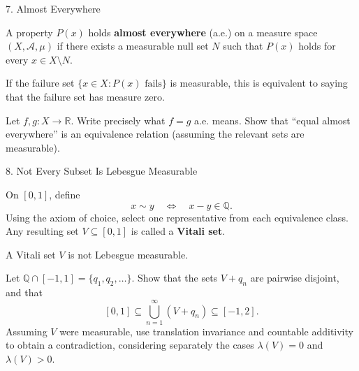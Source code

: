 \documentclass[12pt,a4paper]{article}
\begin{document}
\clearpage

\begin{heading}
    7. Almost Everywhere
\end{heading}

\vspace{10pt}

\begin{definition}
    A property $P(x)$ holds \textbf{almost everywhere} (a.e.) on a measure space $(X,\mathcal{A},\mu)$ if there exists a measurable null set $N$ such that $P(x)$ holds for every $x\in X\setminus N$.

    If the failure set $\{x\in X:P(x)\text{ fails}\}$ is measurable, this is equivalent to saying that the failure set has measure zero.
\end{definition}

\clearpage

\begin{problem}
    Let $f,g:X\to\mathbb{R}$. Write precisely what $f=g$ a.e. means. Show that ``equal almost everywhere'' is an equivalence relation (assuming the relevant sets are measurable).
\end{problem}

\clearpage

\begin{heading}
    8. Not Every Subset Is Lebesgue Measurable
\end{heading}

\vspace{10pt}

\begin{definition}
    On $[0,1]$, define
    \[
        x\sim y\quad\Longleftrightarrow\quad x-y\in\mathbb{Q}.
    \]
    Using the axiom of choice, select one representative from each equivalence class. Any resulting set $V\subseteq[0,1]$ is called a \textbf{Vitali set}.
\end{definition}

\begin{theorem}
    A Vitali set $V$ is not Lebesgue measurable.
\end{theorem}

\clearpage

\begin{problem}
    Let $\mathbb{Q}\cap[-1,1]=\{q_1,q_2,\ldots\}$. Show that the sets $V+q_n$ are pairwise disjoint, and that
    \[
        [0,1]\subseteq\bigcup_{n=1}^{\infty}(V+q_n)\subseteq[-1,2].
    \]
    Assuming $V$ were measurable, use translation invariance and countable additivity to obtain a contradiction, considering separately the cases $\lambda(V)=0$ and $\lambda(V)>0$.
\end{problem}
\end{document}
